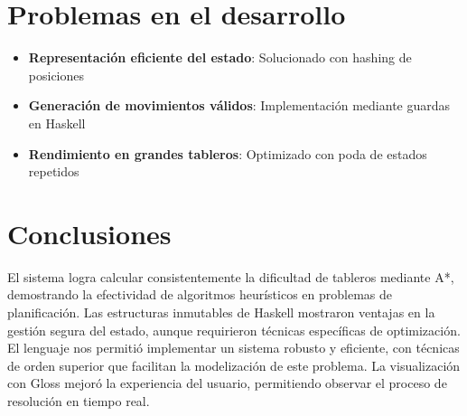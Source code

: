 \documentclass{article}
\begin{document}
\section*{Problemas en el desarrollo}
\begin{itemize}
\item \textbf{Representación eficiente del estado}: Solucionado con hashing de posiciones
\item \textbf{Generación de movimientos válidos}: Implementación mediante guardas en Haskell
\item \textbf{Rendimiento en grandes tableros}: Optimizado con poda de estados repetidos
\end{itemize}

\section{Conclusiones}
El sistema logra calcular consistentemente la dificultad de tableros mediante A*, demostrando la efectividad de algoritmos heurísticos en problemas de planificación. Las estructuras inmutables de Haskell mostraron ventajas en la gestión segura del estado, aunque requirieron técnicas específicas de optimización. El lenguaje nos permitió implementar un sistema robusto y eficiente, con técnicas de orden superior que facilitan la modelización de este problema. La visualización con Gloss mejoró la experiencia del usuario, permitiendo observar el proceso de resolución en tiempo real.
\end{document}
